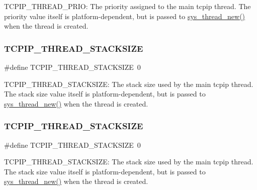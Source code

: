 T\+C\+P\+I\+P\+\_\+\+T\+H\+R\+E\+A\+D\+\_\+\+P\+R\+IO\+: The priority assigned to the main tcpip thread. The priority value itself is platform-\/dependent, but is passed to \hyperlink{group__sys__misc_ga0d596afdd8dbcfad320172d39b0f607a}{sys\+\_\+thread\+\_\+new()} when the thread is created. \mbox{\label{group__lwip__opts__thread_gaa02b84eafa0c8b09b158b97c96d79db0}} 
\subsubsection{\texorpdfstring{T\+C\+P\+I\+P\+\_\+\+T\+H\+R\+E\+A\+D\+\_\+\+S\+T\+A\+C\+K\+S\+I\+ZE}{TCPIP\_THREAD\_STACKSIZE}\hspace{0.1cm}{\footnotesize\ttfamily [1/2]}}
{\footnotesize\ttfamily \#define T\+C\+P\+I\+P\+\_\+\+T\+H\+R\+E\+A\+D\+\_\+\+S\+T\+A\+C\+K\+S\+I\+ZE~0}

T\+C\+P\+I\+P\+\_\+\+T\+H\+R\+E\+A\+D\+\_\+\+S\+T\+A\+C\+K\+S\+I\+ZE\+: The stack size used by the main tcpip thread. The stack size value itself is platform-\/dependent, but is passed to \hyperlink{group__sys__misc_ga0d596afdd8dbcfad320172d39b0f607a}{sys\+\_\+thread\+\_\+new()} when the thread is created. \mbox{\label{group__lwip__opts__thread_gaa02b84eafa0c8b09b158b97c96d79db0}} 
\subsubsection{\texorpdfstring{T\+C\+P\+I\+P\+\_\+\+T\+H\+R\+E\+A\+D\+\_\+\+S\+T\+A\+C\+K\+S\+I\+ZE}{TCPIP\_THREAD\_STACKSIZE}\hspace{0.1cm}{\footnotesize\ttfamily [2/2]}}
{\footnotesize\ttfamily \#define T\+C\+P\+I\+P\+\_\+\+T\+H\+R\+E\+A\+D\+\_\+\+S\+T\+A\+C\+K\+S\+I\+ZE~0}

T\+C\+P\+I\+P\+\_\+\+T\+H\+R\+E\+A\+D\+\_\+\+S\+T\+A\+C\+K\+S\+I\+ZE\+: The stack size used by the main tcpip thread. The stack size value itself is platform-\/dependent, but is passed to \hyperlink{group__sys__misc_ga0d596afdd8dbcfad320172d39b0f607a}{sys\+\_\+thread\+\_\+new()} when the thread is created. 